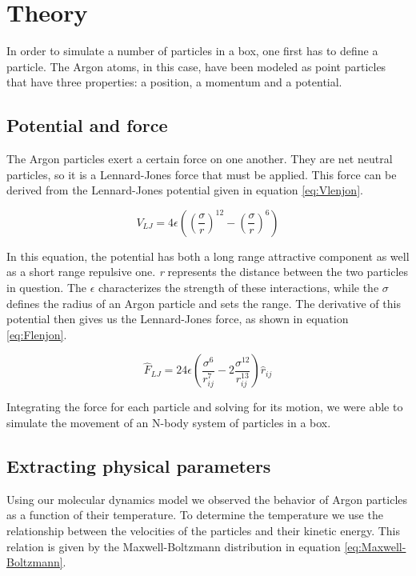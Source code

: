 \documentclass[a4paper,twoside,12pt]{article}
\begin{document}
\section{Theory}
\noindent In order to simulate a number of particles in a box, one first has to define a particle. The Argon atoms, in this case, have been modeled as point particles that have three properties: a position, a momentum and a potential.

\subsection{Potential and force}
\noindent The Argon particles exert a certain force on one another. They are net neutral particles, so it is a Lennard-Jones force that must be applied. This force can be derived from the Lennard-Jones potential given in equation \ref{eq:Vlenjon}.

\begin{equation}
\label{eq:Vlenjon}
V_{LJ} = 4\epsilon \left(\left(\frac{\sigma}{r}\right)^{12}-\left(\frac{\sigma}{r}\right)^6\right)
\end{equation}

\noindent In this equation, the potential has both a long range attractive component as well as a short range repulsive one. \textit{r} represents the distance between the two particles in question. The $\epsilon$ characterizes the strength of these interactions, while the  $\sigma$ defines the radius of an Argon particle and sets the range. The derivative of this potential then gives us the Lennard-Jones force, as shown in equation \ref{eq:Flenjon}.

\begin{equation}
\label{eq:Flenjon}
\hat{F}_{LJ} = 24\epsilon \left(\frac{\sigma^6}{r^7_{ij}}-2\frac{\sigma^{12}}{r^{13}_{ij}}\right)\hat{r}_{ij}
\end{equation}

\noindent Integrating the force for each particle and solving for its motion, we were able to simulate the movement of an N-body system of particles in a box.

\subsection{Extracting physical parameters}

\noindent Using our molecular dynamics model we observed the behavior of Argon particles as a function of their temperature. To determine the temperature we use the relationship between the velocities of the particles and their kinetic energy. This relation is given by the Maxwell-Boltzmann distribution in equation \ref{eq:Maxwell-Boltzmann}.
\end{document}
